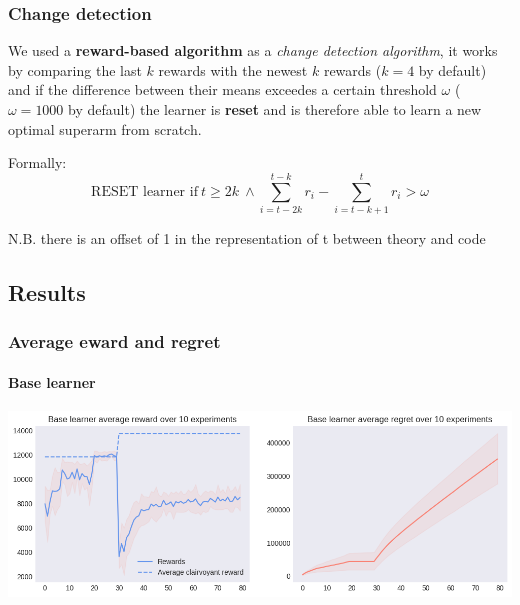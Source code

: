 
\begin{frame}
\frametitle{Change detection}

We used a \textbf{reward-based algorithm} as a \textit{change detection algorithm}, it works by comparing the last $k$ rewards with the newest $k$ rewards ($k=4$ by default) and if the difference between their means exceedes a certain threshold $\omega$ ($\omega=1000$ by default) the learner is \textbf{reset} and is therefore able to learn a new optimal superarm from scratch.

Formally:
\begin{displaymath}
    \text{RESET learner if} ~ t \geq 2k ~ \land \sum_{i=t-2k}^{t-k} r_i -\sum_{i=t-k+1}^t r_i > \omega
\end{displaymath}

\scriptsize N.B. there is an offset of 1 in the representation of t between theory and code

\end{frame}


\subsection{Results}


\begin{frame}[plain]

\frametitle{Average eward and regret}
\framesubtitle{Base learner}

\begin{center}
    \hspace*{-2.8em}
    \includegraphics[scale=0.5]{img/Graphs/non_stationary/image1.png}
\end{center}

\end{frame}

